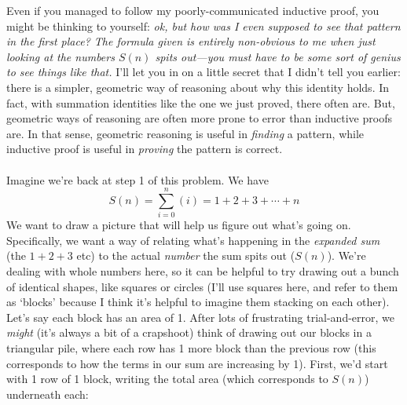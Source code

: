 \documentclass[10pt]{article}
\theoremstyle{definition}
\begin{document}
Even if you managed to follow my poorly-communicated inductive proof, you might be thinking to yourself: \textit{ok, but how was I even supposed to see that pattern in the first place?  The formula given is entirely non-obvious to me when just looking at the numbers $S(n)$ spits out---you must have to be some sort of genius to see things like that.}  I'll let you in on a little secret that I didn't tell you earlier: there is a simpler, geometric way of reasoning about why this identity holds.  In fact, with summation identities like the one we just proved, there often are.  But, geometric ways of reasoning are often more prone to error than inductive proofs are.  In that sense, geometric reasoning is useful in \emph{finding} a pattern, while inductive proof is useful in \emph{proving} the pattern is correct.  \\~\\
Imagine we're back at step 1 of this problem.  We have 
\[S(n) = \sum_{i=0}^n(i) = 1 + 2 + 3 + \cdots + n\]
We want to draw a picture that will help us figure out what's going on.  Specifically, we want a way of relating what's happening in the \emph{expanded sum} (the $1+2+3$ etc) to the actual \emph{number} the sum spits out ($S(n)$).  We're dealing with whole numbers here, so it can be helpful to try drawing out a bunch of identical shapes, like squares or circles (I'll use squares here, and refer to them as `blocks' because I think it's helpful to imagine them stacking on each other).  Let's say each block has an area of 1.  After lots of frustrating trial-and-error, we \emph{might} (it's always a bit of a crapshoot) think of drawing out our blocks in a triangular pile, where each row has 1 more block than the previous row (this corresponds to how the terms in our sum are increasing by 1).  First, we'd start with 1 row of 1 block, writing the total area (which corresponds to $S(n)$) underneath each:
\end{document}
